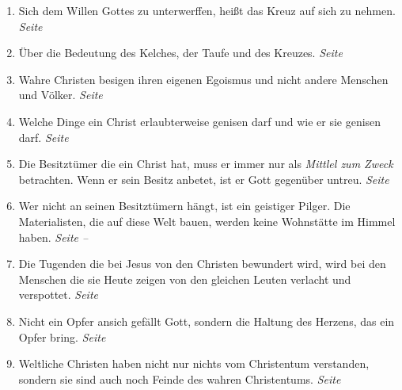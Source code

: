 \begin{enumerate}
 \item Sich dem Willen Gottes zu unterwerffen, heißt das Kreuz auf sich zu
nehmen.
 \dotfill \textit{Seite
\pageref{ref:03_05_kreuz_auf_sich_nehmen}}\\

 \item Über die Bedeutung des Kelches, der Taufe und des Kreuzes.
 \dotfill \textit{Seite
\pageref{ref:04_04_kelch_taufe_kreuz}}\\

 \item Wahre Christen besigen ihren eigenen Egoismus und nicht andere Menschen
und Völker.
 \dotfill \textit{Seite \pageref{ref:04_05_besigen}}\\
 
 \item Welche Dinge ein Christ erlaubterweise genisen darf und wie er sie
genisen darf.
 \dotfill \textit{Seite \pageref{ref:04_07_vorteile}}\\
 
 \item Die Besitztümer die ein Christ hat, muss er immer nur als \textit{Mittlel
zum Zweck} betrachten. Wenn er sein Besitz anbetet, ist er Gott gegenüber
untreu.
 \dotfill \textit{Seite \pageref{ref:04_07_vorteile}}\\
 
 \item Wer nicht an seinen Besitztümern hängt, ist ein geistiger Pilger. Die
Materialisten, die auf diese Welt bauen, werden keine Wohnstätte im Himmel
haben.
 \dotfill \textit{Seite \pageref{ref:04_10_pilger} --
\pageref{ref:04_10_pilger_ende}}\\

 \item Die Tugenden die bei Jesus von den Christen bewundert wird, wird bei den
Menschen die sie Heute zeigen von den gleichen Leuten verlacht und verspottet.
 \dotfill \textit{Seite \pageref{ref:04_10_pilger}}\\
 \item Nicht ein Opfer ansich gefällt Gott, sondern die Haltung des Herzens, das
ein Opfer bring.
 \dotfill \textit{Seite \pageref{ref:04_13_opfer}}\\
 \item Weltliche Christen haben nicht nur nichts vom Christentum verstanden,
sondern sie sind auch noch Feinde des wahren Christentums.
 \dotfill \textit{Seite
\pageref{ref:04_13_weltliche_christen}}\\


\end{enumerate}
